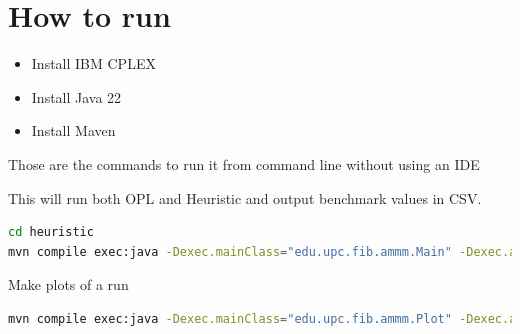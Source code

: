 \documentclass{article}
\begin{document}
\section{How to run}

\begin{itemize}
  \item Install IBM CPLEX
  \item Install Java 22
  \item Install Maven
\end{itemize}

Those are the commands to run it from command line without using an IDE

This will run both OPL and Heuristic and output benchmark values in CSV.

\begin{lstlisting}[language=bash]
cd heuristic
mvn compile exec:java -Dexec.mainClass="edu.upc.fib.ammm.Main" -Dexec.args="../opl"
\end{lstlisting}

Make plots of a run

\begin{lstlisting}[language=bash]
mvn compile exec:java -Dexec.mainClass="edu.upc.fib.ammm.Plot" -Dexec.args="output.csv"
\end{lstlisting}
\end{document}
